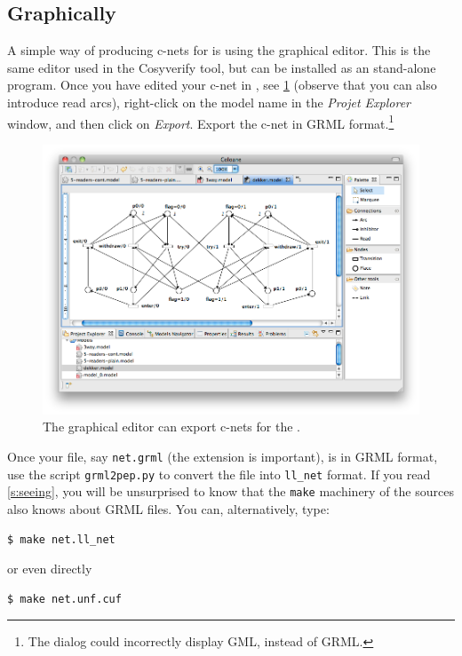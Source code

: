 \documentclass[a4paper]{refart}
\begin{document}
\subsection{Graphically}%
\label{s:graphically}

A simple way of producing c-nets for \cunf is
using the \coloane graphical editor\cite{Coloane}.  This is the same editor
used in the Cosyverify tool, but can be installed as an stand-alone
program.  Once you have edited your c-net in \coloane, see \cref{f:coloane}
(observe that you can also introduce read arcs), right-click on the model
name in the \textit{Projet Explorer} window, and then click on
\textit{Export}.  Export the c-net in GRML format.\footnote{The dialog
could incorrectly display GML, instead of GRML.}

\begin{figure}[bth]
\hspace{-4em}
\includegraphics[scale=0.4]{fig/coloane.png}
\caption{The \coloane graphical editor can export c-nets for the \cunft{}.}
\label{f:coloane}
\end{figure}

Once your file, say \verb!net.grml! (the extension is important),
is in GRML format, use the script
\verb!grml2pep.py! to convert the file into
\verb!ll_net! format.  If you read \cref{s:seeing}, you will be unsurprised
to know that the \verb!make! machinery of the \cunft{} sources
also knows about GRML files.  You can, alternatively, type:
\begin{verbatim}
$ make net.ll_net
\end{verbatim}
or even directly
\begin{verbatim}
$ make net.unf.cuf
\end{verbatim}
\end{document}
